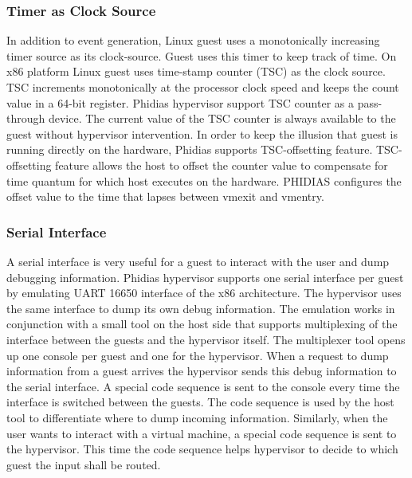 \subsubsection{Timer as Clock Source}
In addition to event generation, Linux guest uses a monotonically increasing timer source as its clock-source. 
Guest uses this timer to keep track of time. 
On x86 platform Linux guest uses time-stamp counter (TSC) as the clock source. 
TSC increments monotonically at the processor clock speed and keeps the count value in a 64-bit register.
Phidias hypervisor support TSC counter as a pass-through device.
The current value of the TSC counter is always available to the guest without hypervisor intervention.
In order to keep the illusion that guest is running directly on the hardware, Phidias supports TSC-offsetting feature.
TSC-offsetting feature allows the host to offset the counter value to compensate for time quantum for which host executes on the hardware.
PHIDIAS configures the offset value to the time that lapses between vmexit and vmentry.

\subsubsection{Serial Interface}
A serial interface is very useful for a guest to interact with the user and dump debugging information.
Phidias hypervisor supports one serial interface per guest by emulating UART 16650 interface of the x86 architecture.
The hypervisor uses the same interface to dump its own debug information. 
The emulation works in conjunction with a small tool on the host side that supports multiplexing of the interface between the guests and the hypervisor itself.
The multiplexer tool opens up one console per guest and one for the hypervisor. When a request to dump information from a guest arrives the hypervisor
sends this debug information to the serial interface. A special code sequence is sent to the console every time the interface is switched between the guests.
The code sequence is used by the host tool to differentiate where to dump incoming information. 
Similarly, when the user wants to interact with a virtual machine, a special code sequence is sent to the hypervisor.
This time the code sequence helps hypervisor to decide to which guest the input shall be routed. 
